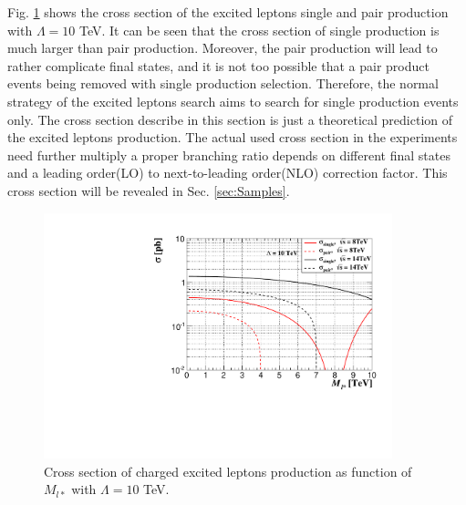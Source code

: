 Fig. \ref{fig:XS} shows the cross section of the excited leptons single and pair production with $\Lambda = 10$ TeV. It can be seen that the cross section of single production is much larger than pair production. Moreover, the pair production will lead to rather complicate final states, and it is not too possible that a pair product events being removed with single production selection. Therefore, the normal strategy of the excited leptons search aims to search for single production events only.
\newline The cross section describe in this section is just a theoretical prediction of the excited leptons production. The actual used cross section in the experiments need further multiply a proper branching ratio depends on different final states and a leading order(LO) to next-to-leading order(NLO) correction factor. This cross section will be revealed in Sec. \ref{sec:Samples}.
\begin{figure}[h!]
\begin{center}
\includegraphics[width=0.9\textwidth]{plot/XS.pdf}  
\caption{\label{fig:XS}Cross section of charged excited leptons production as function of $M_{l*}$ with $\Lambda = 10$ TeV.}
\end{center}
\end{figure}
\newpage
